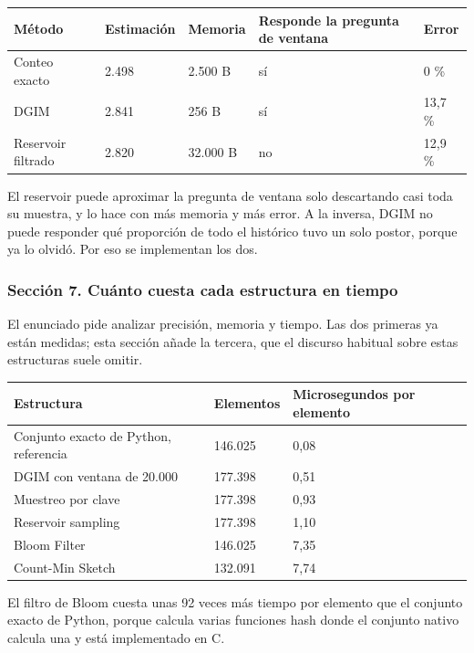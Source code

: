\documentclass[11pt]{article}
\begin{document}
\begin{center}\footnotesize
\begin{tabularx}{\linewidth}{Q{0.974}Q{0.940}Q{0.822}Q{1.677}Q{0.587}}
\toprule
\textbf{Método} & \textbf{Estimación} & \textbf{Memoria} & \textbf{Responde la pregunta de ventana} & \textbf{Error} \\
\midrule
Conteo exacto & 2.498 & 2.500 B & sí & 0 \% \\
DGIM & 2.841 & 256 B & sí & 13,7 \% \\
Reservoir filtrado & 2.820 & 32.000 B & no & 12,9 \% \\
\bottomrule
\end{tabularx}
\end{center}
El reservoir puede aproximar la pregunta de ventana solo descartando casi toda su muestra, y lo hace con más memoria y más error. A la inversa, DGIM no puede responder qué proporción de todo el histórico tuvo un solo postor, porque ya lo olvidó. Por eso se implementan los dos.

\subsubsection*{Sección 7. Cuánto cuesta cada estructura en tiempo}
El enunciado pide analizar precisión, memoria y tiempo. Las dos primeras ya están medidas; esta sección añade la tercera, que el discurso habitual sobre estas estructuras suele omitir.

\begin{center}\footnotesize
\begin{tabularx}{\linewidth}{Q{1.447}Q{0.537}Q{1.017}}
\toprule
\textbf{Estructura} & \textbf{Elementos} & \textbf{Microsegundos por elemento} \\
\midrule
Conjunto exacto de Python, referencia & 146.025 & 0,08 \\
DGIM con ventana de 20.000 & 177.398 & 0,51 \\
Muestreo por clave & 177.398 & 0,93 \\
Reservoir sampling & 177.398 & 1,10 \\
Bloom Filter & 146.025 & 7,35 \\
Count-Min Sketch & 132.091 & 7,74 \\
\bottomrule
\end{tabularx}
\end{center}
El filtro de Bloom cuesta unas 92 veces más tiempo por elemento que el conjunto exacto de Python, porque calcula varias funciones hash donde el conjunto nativo calcula una y está implementado en C.
\end{document}
